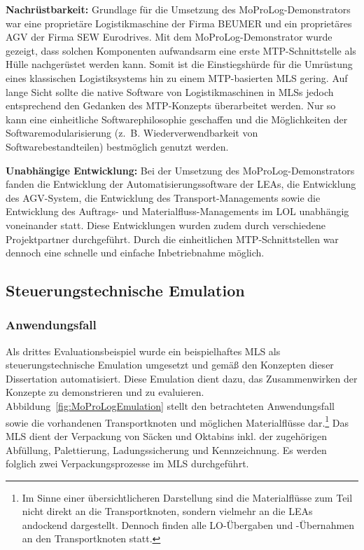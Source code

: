 \textbf{Nachrüstbarkeit:} Grundlage für die Umsetzung des MoProLog-Demonstrators war eine proprietäre Logistikmaschine der Firma BEUMER und ein proprietäres AGV der Firma SEW Eurodrives. Mit dem MoProLog-Demonstrator wurde gezeigt, dass solchen Komponenten aufwandsarm eine erste MTP-Schnittstelle als Hülle nachgerüstet werden kann. Somit ist die Einstiegshürde für die Umrüstung eines klassischen Logistiksystems hin zu einem MTP-basierten MLS gering. Auf lange Sicht sollte die native Software von Logistikmaschinen in MLSs jedoch entsprechend den Gedanken des MTP-Konzepts überarbeitet werden. Nur so kann eine einheitliche Softwarephilosophie geschaffen und die Möglichkeiten der Softwaremodularisierung (z.~B. Wiederverwendbarkeit von Softwarebestandteilen) bestmöglich genutzt werden.

\textbf{Unabhängige Entwicklung:} Bei der Umsetzung des MoProLog-Demonstrators fanden die Entwicklung der Automatisierungssoftware der LEAs, die Entwicklung des AGV-System, die Entwicklung des Transport-Managements sowie die Entwicklung des Auftrags- und Materialfluss-Managements im LOL unabhängig voneinander statt. Diese Entwicklungen wurden zudem durch verschiedene Projektpartner durchgeführt. Durch die einheitlichen MTP-Schnittstellen war dennoch eine schnelle und einfache Inbetriebnahme möglich.

\subsection{Steuerungstechnische Emulation}
\label{subsec:EvaluationsBeispielEmulation}

\subsubsection{Anwendungsfall}

Als drittes Evaluationsbeispiel wurde ein beispielhaftes MLS als steuerungstechnische Emulation umgesetzt und gemäß den Konzepten dieser Dissertation automatisiert. Diese Emulation dient dazu, das Zusammenwirken der Konzepte zu demonstrieren und zu evaluieren. Abbildung~\ref{fig:MoProLogEmulation} stellt den betrachteten Anwendungsfall sowie die vorhandenen Transportknoten und möglichen Materialflüsse dar.\footnote{Im Sinne einer übersichtlicheren Darstellung sind die Materialflüsse zum Teil nicht direkt an die Transportknoten, sondern vielmehr an die LEAs andockend dargestellt. Dennoch finden alle LO-Übergaben und -Übernahmen an den Transportknoten statt.} Das MLS dient der Verpackung von Säcken und Oktabins inkl. der zugehörigen Abfüllung, Palettierung, Ladungssicherung und Kennzeichnung. Es werden folglich zwei Verpackungsprozesse im MLS durchgeführt.

